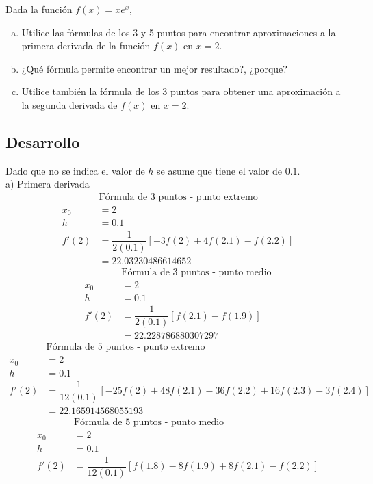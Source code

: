 \begin{exerciseT}
	Dada la función $f(x) = xe^x$, 
		\begin{enumerate}[a)]
			\item Utilice las fórmulas de los 3 y 5 puntos para encontrar aproximaciones a la primera derivada de 
				la función $f(x)$ en $x=2$. 
			\item ¿Qué fórmula permite encontrar un mejor resultado?, ¿porque?
			\item Utilice también la fórmula de los 3 puntos para obtener una aproximación a la segunda derivada de $f(x)$ en $x=2$.
		\end{enumerate}	
	\subsection*{Desarrollo}
	Dado que no se indica el valor de $h$ se asume que tiene el valor de $0.1$.\\
	a) Primera derivada
	\begin{align*}
		&\mbox{Fórmula de 3 puntos - punto extremo}\\
		x_0 &= 2\\
		h &= 0.1\\
		f'(2) &= \dfrac{1}{2(0.1)}\left[-3f(2) + 4f(2.1) - f(2.2)\right]\\
			&= 22.03230486614652
	\end{align*}
	\begin{align*}
		&\mbox{Fórmula de 3 puntos - punto medio}\\
		x_0 &= 2\\
		h &= 0.1\\
		f'(2) &= \dfrac{1}{2(0.1)}\left[f(2.1)-f(1.9)\right]\\
			&= 22.228786880307297
	\end{align*}
	\begin{align*}
		&\mbox{Fórmula de 5 puntos - punto extremo}\\
		x_0 &= 2\\
		h &= 0.1\\
		f'(2) &= \dfrac{1}{12(0.1)}\left[-25f(2)+48f(2.1)-36f(2.2)+16f(2.3)-3f(2.4)\right]\\
			&= 22.165914568055193
	\end{align*}
	\begin{align*}
		&\mbox{Fórmula de 5 puntos - punto medio}\\
		x_0 &= 2\\
		h &= 0.1\\
		f'(2) &= \dfrac{1}{12(0.1)}\left[f(1.8)-8f(1.9)+8f(2.1)-f(2.2)\right]\\

\end{align*}
\end{exerciseT}
